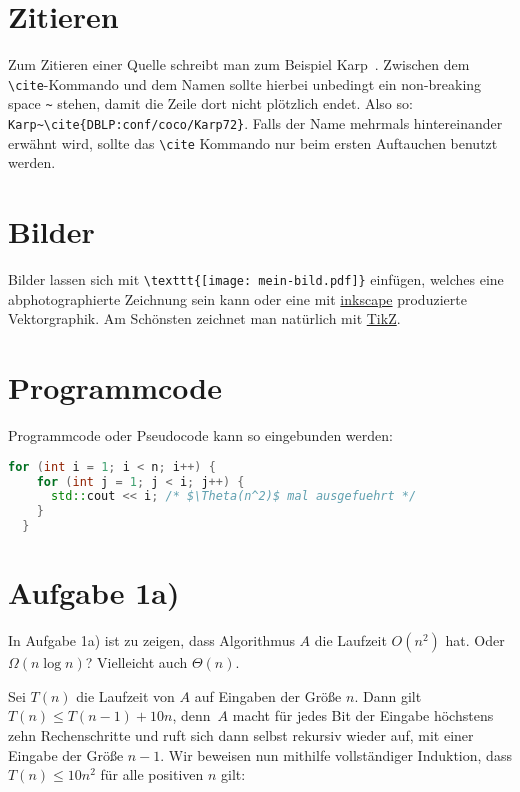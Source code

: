 \documentclass[a4paper,11pt,oneside]{scrartcl}
\begin{document}
\section*{Zitieren}

Zum Zitieren einer Quelle schreibt man zum Beispiel Karp~\cite{DBLP:conf/coco/Karp72}.
Zwischen dem \verb|\cite|-Kommando und dem Namen sollte hierbei unbedingt ein non-breaking space \verb|~| stehen, damit die Zeile dort nicht plötzlich endet. Also so: \verb|Karp~\cite{DBLP:conf/coco/Karp72}|. Falls der Name mehrmals hintereinander erwähnt wird, sollte das \verb|\cite| Kommando nur beim ersten Auftauchen benutzt werden.


\section*{Bilder}

Bilder lassen sich mit \verb|\texttt{[image: mein-bild.pdf]}| einfügen, welches eine abphotographierte Zeichnung sein kann oder eine mit \href{https://inkscape.org/}{inkscape} produzierte Vektorgraphik. Am Schönsten zeichnet man natürlich mit \href{https://www.overleaf.com/learn/latex/TikZ_package/}{TikZ}.


\section*{Programmcode}

Programmcode oder Pseudocode kann so eingebunden werden:
\begin{lstlisting}[language=C++]
  for (int i = 1; i < n; i++) {
    for (int j = 1; j < i; j++) {
      std::cout << i; /* $\Theta(n^2)$ mal ausgefuehrt */
    }
  }
\end{lstlisting}


\section*{Aufgabe 1a)}

In Aufgabe 1a) ist zu zeigen, dass Algorithmus $A$ die Laufzeit $O(n^2)$ hat. Oder $\Omega(n\log n)$? Vielleicht auch $\Theta(n)$.

Sei $T(n)$ die Laufzeit von $A$ auf Eingaben der Größe $n$.
Dann gilt $T(n)\le T(n-1) + 10n$, denn~$A$ macht für jedes Bit der Eingabe höchstens zehn Rechenschritte und ruft sich dann selbst rekursiv wieder auf, mit einer Eingabe der Größe $n-1$. Wir beweisen nun mithilfe vollständiger Induktion, dass $T(n)\le 10n^2$ für alle positiven $n$ gilt:
\end{document}
